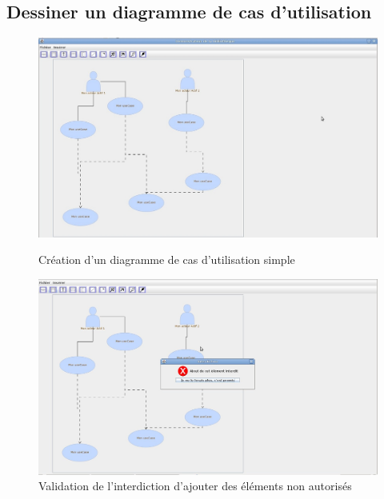 \documentclass[12pt,a4paper,openany]{report}
\begin{document}
		\subsection{Dessiner un diagramme de cas d'utilisation}
		\begin{figure}[H]
			\centering
			\includegraphics[width=16cm]{validation3.jpg}
			\caption{Création d'un diagramme de cas d'utilisation simple}
			\includegraphics[width=16cm]{validation4.jpg}
			\caption{Validation de l'interdiction d'ajouter des éléments non autorisés}
		\end{figure}
\end{document}
